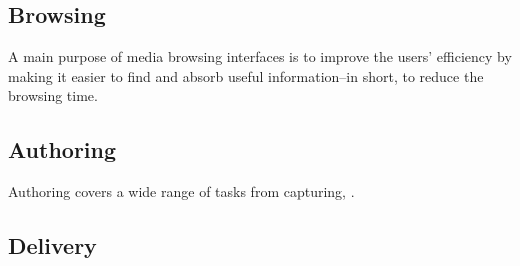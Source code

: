 \subsection{Browsing}
A main purpose of media browsing interfaces is to improve the users' efficiency by making it easier to find and absorb useful information--in short, to reduce the browsing time. 
\subsection{Authoring}
Authoring covers a wide range of tasks from capturing, . 

\subsection{Delivery}


 


